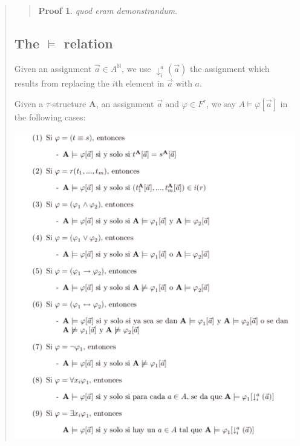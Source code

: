 \documentclass[a4paper, 12pt]{article}
\theoremstyle{definition}
\theoremstyle{definition}
\theoremstyle{definition}
\newtheorem{pro}{Proof}
\begin{document}
\begin{quote}
\begin{quote}
\begin{pro}
    \textit{quod eram demonstrandum}.
\end{pro}

\end{quote}
\normalsize

\subsection{The $\vDash$ relation}

Given an assignment $\overrightarrow{a} \in A^\mathbb{N}$, we use
$\downarrow_{i}^{a}(\overrightarrow{a})$ the assignment which results from
replacing the $i$th element in $\overrightarrow{a}$ with $a$.

Given a $\tau$-structure $\textbf{A}$, an assignment $\overrightarrow{a}$ and 
$\varphi \in F^{\tau}$, we say $A \vDash \varphi[\overrightarrow{a}]$ in the 
following cases:

\begin{center}
\includegraphics[scale=0.7]{vDash}
\end{center}


\end{quote}
\end{document}
